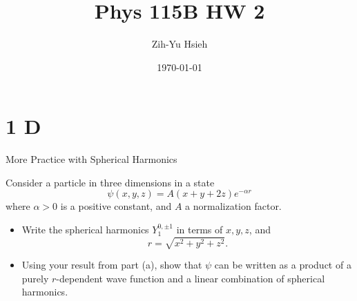 \documentclass{article}
\title{Phys 115B HW 2}
\author{Zih-Yu Hsieh}
\date{\today}
\begin{document}
\maketitle

\section*{1 D}

\begin{ques}\label{q1}
More Practice with Spherical Harmonics

Consider a particle in three dimensions in a state
\[
\psi(x,y,z)=A(x+y+2z)e^{-\alpha r}
\]
where $\alpha>0$ is a positive constant, and $A$ a normalization factor.

\begin{itemize}
\item[(a)] Write the spherical harmonics $Y^{0,\pm1}_{1}$ in terms of $x,y,z$, and
\[
r=\sqrt{x^{2}+y^{2}+z^{2}}.
\]

\item[(b)] Using your result from part (a), show that $\psi$ can be written as a product of a purely
$r$-dependent wave function and a linear combination of spherical harmonics.
\end{itemize}
\end{ques}
\end{document}
